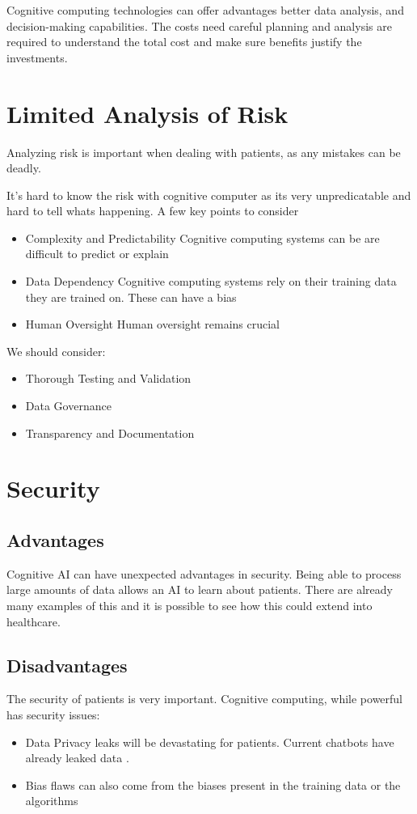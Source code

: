\documentclass{article}
\begin{document}
Cognitive computing technologies can offer advantages better data analysis, and decision-making capabilities. The costs need careful planning and analysis are required to understand the total cost and make sure benefits justify the investments.

\section{Limited Analysis of Risk}
Analyzing risk is important when dealing with patients, as any mistakes can be deadly.

It's hard to know the risk with cognitive computer as its very unpredicatable and hard to tell whats happening. A few key points to consider 

\begin{itemize}
	\item Complexity and Predictability Cognitive computing systems can be are difficult to predict or explain
	\item Data Dependency Cognitive computing systems rely on their training data they are trained on. These can have a bias
	\item Human Oversight Human oversight remains crucial
\end{itemize}

We should consider:
\begin{itemize}
	\item Thorough Testing and Validation
	\item Data Governance
	\item Transparency and Documentation
\end{itemize}

\section{Security}
\subsection{Advantages}
Cognitive AI can have unexpected advantages in security. Being able to process large amounts of data allows an AI to learn about patients. There are already many examples of this \cite{security} and it is possible to see how this could extend into healthcare.

\subsection{Disadvantages}
The security of patients is very important. Cognitive computing, while powerful has security issues:
\begin{itemize}
	\item Data Privacy  leaks will be devastating for patients. Current chatbots have already leaked data \cite{wired}.

	\item Bias flaws can also come from the biases present in the training data or the algorithms 
\end{itemize}
\end{document}
